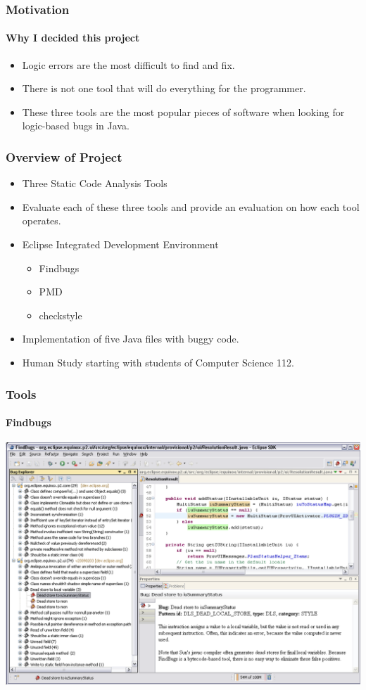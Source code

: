 \documentclass{beamer}
\begin{document}
\begin{frame}
\frametitle{Motivation}
\framesubtitle{Why I decided this project}
\begin{itemize}
\item<1-> Logic errors are the most difficult to find and fix.
\item<2-> There is not one tool that will do everything for the programmer.
\item<3-> These three tools are the most popular pieces of software when looking for logic-based bugs in Java.
\end{itemize}
\end{frame}



\begin{frame}
\frametitle{Overview of Project}
\begin{itemize}
\item<1-> Three Static Code Analysis Tools
\item<1-> Evaluate each of these three tools and provide an evaluation on how each tool operates.
\item<2-> Eclipse Integrated Development Environment
\begin{itemize}
\item<3-> Findbugs
\item<4-> PMD
\item<5-> checkstyle
\end{itemize}
\item<6-> Implementation of five Java files with buggy code.
\item<7-> Human Study starting with students of Computer Science 112.
\end{itemize}
\end{frame}

\begin{frame}
\frametitle{Tools}
\framesubtitle{Findbugs}
\centering
\includegraphics[scale=0.3]{findbugs_1}
\end{frame}
\end{document}
